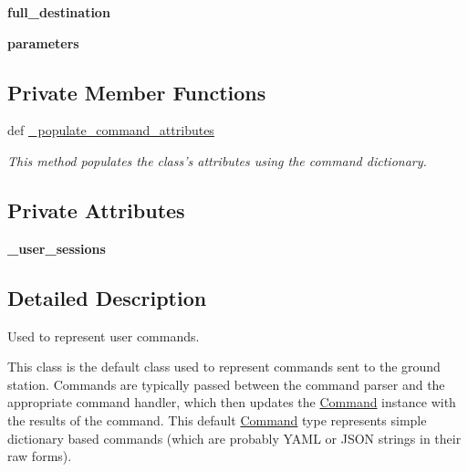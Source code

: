 \begin{DoxyCompactItemize}
\item 
\hypertarget{classhwm_1_1command_1_1command_1_1_command_a6a584fc25612a9b76e11de4d5f3889df}{{\bfseries full\-\_\-destination}}\label{classhwm_1_1command_1_1command_1_1_command_a6a584fc25612a9b76e11de4d5f3889df}

\item 
\hypertarget{classhwm_1_1command_1_1command_1_1_command_afbc5fbffce86bf192d028f696d0db3f4}{{\bfseries parameters}}\label{classhwm_1_1command_1_1command_1_1_command_afbc5fbffce86bf192d028f696d0db3f4}

\end{DoxyCompactItemize}
\subsection*{Private Member Functions}
\begin{DoxyCompactItemize}
\item 
def \hyperlink{classhwm_1_1command_1_1command_1_1_command_a4712648004d00b70220269d59dfe42ae}{\-\_\-populate\-\_\-command\-\_\-attributes}
\begin{DoxyCompactList}\small\item\em This method populates the class's attributes using the command dictionary. \end{DoxyCompactList}\end{DoxyCompactItemize}
\subsection*{Private Attributes}
\begin{DoxyCompactItemize}
\item 
\hypertarget{classhwm_1_1command_1_1command_1_1_command_a8e9afb936331963d277258c9077ad12f}{{\bfseries \-\_\-user\-\_\-sessions}}\label{classhwm_1_1command_1_1command_1_1_command_a8e9afb936331963d277258c9077ad12f}

\end{DoxyCompactItemize}


\subsection{Detailed Description}
Used to represent user commands. 

This class is the default class used to represent commands sent to the ground station. Commands are typically passed between the command parser and the appropriate command handler, which then updates the \hyperlink{classhwm_1_1command_1_1command_1_1_command}{Command} instance with the results of the command. This default \hyperlink{classhwm_1_1command_1_1command_1_1_command}{Command} type represents simple dictionary based commands (which are probably Y\-A\-M\-L or J\-S\-O\-N strings in their raw forms). 

